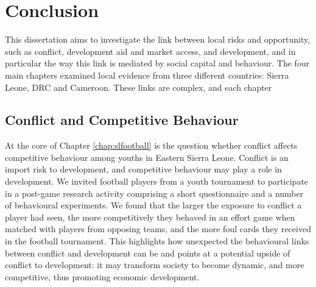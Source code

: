 \chapter{Conclusion}
\label{chap:conclusion}
This dissertation aims to investigate the link between local risks and opportunity, such as conflict, development aid and market access, and development, and in particular the way this link is mediated by social capital and behaviour. The four main chapters examined local evidence from three different countries: Sierra Leone, DRC and Cameroon. These links are complex, and each chapter






\section{Conflict and Competitive Behaviour}

At the core of Chapter \ref{chap:slfootball} is the question whether conflict affects competitive behaviour among youths in Eastern Sierra Leone. Conflict is an import risk to development, and competitive behaviour may play a role in development. We invited football players from a youth tournament to participate in a post-game research activity comprising a short questionnaire and a number of behavioural experiments. We found that the larger the exposure to conflict a player had seen, the more competitively they behaved in an effort game when matched with players from opposing teams, and the more foul cards they received in the football tournament. This highlights how unexpected the behavioural links between conflict and development can be and points at a potential upside of conflict to development: it may transform society to become dynamic, and more competitive, thus promoting economic development.

